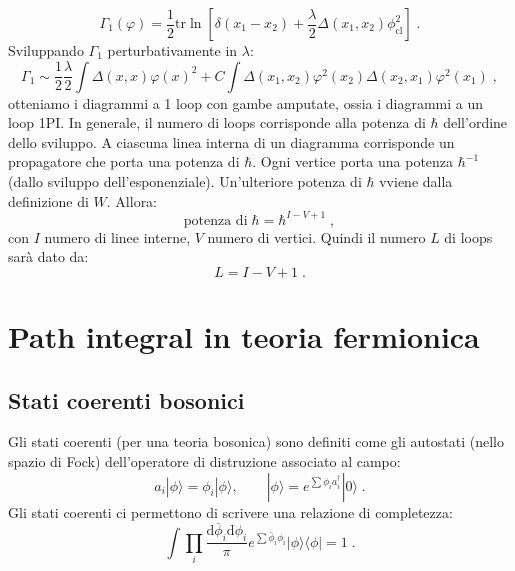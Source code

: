 \documentclass[12pt,a4paper]{article}
\theoremstyle{definition}
\numberwithin{equation}{section}
\newcommand{\diff}[1][]{\mathrm{d}#1}
\newcommand{\bra}{\langle}
\newcommand{\ket}{\rangle}
\newcommand{\adj}[1]{#1^{\dagger}}
\newcommand{\tr}{\mathrm{tr}}
\begin{document}
\begin{equation}
\Gamma_1(\varphi)=\frac{1}{2}\tr\ln\left[\delta(x_1-x_2)+\frac{\lambda}{2}\Delta(x_1,x_2)\phi_{\mathrm{cl}}^2\right]\;.
\end{equation}
Sviluppando $\Gamma_1$ perturbativamente in $\lambda$:
$$
\Gamma_1\sim\frac{1}{2}\frac{\lambda}{2}\int\Delta(x,x)\varphi(x)^2+C\int\Delta(x_1,x_2)\varphi^2(x_2)\Delta(x_2,x_1)\varphi^2(x_1)\;,
$$
otteniamo i diagrammi a 1 loop con gambe amputate, ossia i diagrammi a un loop 1PI. In generale, il numero di loops corrisponde alla potenza di $\hbar$ dell'ordine dello sviluppo. A ciascuna linea interna di un diagramma corrisponde un propagatore che porta una potenza di $\hbar$. Ogni vertice porta una potenza $\hbar^{-1}$ (dallo sviluppo dell'esponenziale). Un'ulteriore potenza di $\hbar$ vviene dalla definizione di $W$. Allora:
\begin{equation}
\boxed{
\mbox{potenza di}\;\hbar=\hbar^{I-V+1}\;,
}
\end{equation}
con $I$ numero di linee interne, $V$ numero di vertici. Quindi il numero $L$ di loops sarà dato da:
\begin{equation}
L=I-V+1\;.
\end{equation}
\section{Path integral in teoria fermionica}
\subsection{Stati coerenti bosonici}
Gli stati coerenti (per una teoria bosonica) sono definiti come gli autostati (nello spazio di Fock) dell'operatore di distruzione associato al campo:
\begin{equation}
a_i|\phi\ket=\phi_i|\phi\ket,\qquad |\phi\ket=e^{\sum\phi_i\adj{a}_i}|0\ket\;.
\end{equation}
Gli stati coerenti ci permettono di scrivere una relazione di completezza:
\begin{equation}
\int\prod_i\frac{\diff{\overline{\phi}_i}\diff{\phi_i}}{\pi}e^{\sum\overline{\phi}_i\phi_i}|\phi\ket\bra\phi|=1\;.
\end{equation}
\end{document}
